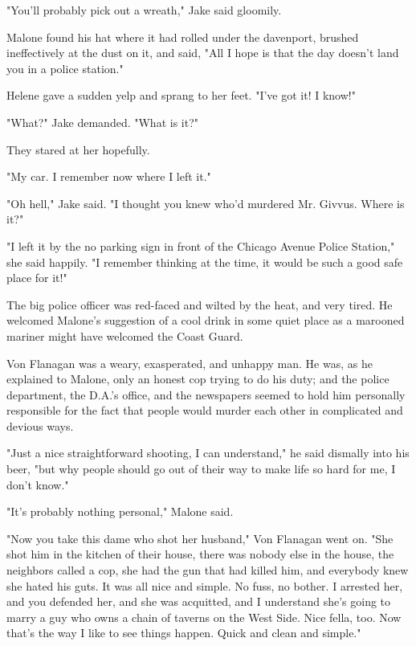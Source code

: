 \documentclass{novel}
\begin{document}
"You'll probably pick out a wreath," Jake said gloomily.

Malone found his hat where it had rolled under the davenport, brushed ineffectively at the dust on it, and said, "All I hope is that the day doesn't land you in a police station."

Helene gave a sudden yelp and sprang to her feet. "I've got it! I know!"

"What?" Jake demanded. "What is it?"

They stared at her hopefully.

"My car. I remember now where I left it."

"Oh hell," Jake said. "I thought you knew who'd murdered Mr. Givvus. Where is it?"

"I left it by the no parking sign in front of the Chicago Avenue Police Station," she said happily. "I remember thinking at the time, it would be such a good safe place for it!"

\begin{ChapterStart}
\vspace{3\nbs}
\end{ChapterStart}

The big police officer was red-faced and wilted by the heat, and very tired. He welcomed Malone's suggestion of a cool drink in some quiet place as a marooned mariner might have welcomed the Coast Guard.

Von Flanagan was a weary, exasperated, and unhappy man. He was, as he explained to Malone, only an honest cop trying to do his duty; and the police department, the D.A.'s office, and the newspapers seemed to hold him personally responsible for the fact that people would murder each other in complicated and devious ways.

"Just a nice straightforward shooting, I can understand," he said dismally into his beer, "but why people should go out of their way to make life so hard for me, I don't know."

"It's probably nothing personal," Malone said.

"Now you take this dame who shot her husband," Von Flanagan went on. "She shot him in the kitchen of their house, there was nobody else in the house, the neighbors called a cop, she had the gun that had killed him, and everybody knew she hated his guts. It was all nice and simple. No fuss, no bother. I arrested her, and you defended her, and she was acquitted, and I understand she's going to marry a guy who owns a chain of taverns on the West Side. Nice fella, too. Now that's the way I like to see things happen. Quick and clean and simple."
\end{document}
